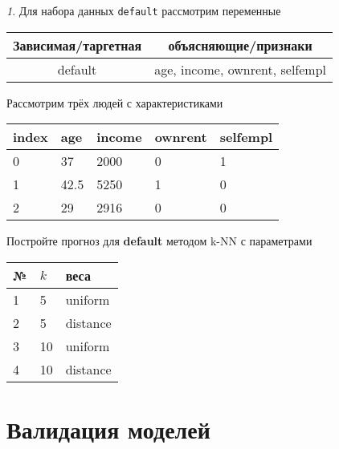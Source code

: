 \documentclass[12pt]{article}
\theoremstyle{remark}
\newtheorem{exercise}{}[section]
\begin{document}
\begin{exercise}
Для набора данных \texttt{default} рассмотрим переменные
\begin{center}
	\begin{tabular}{|c|c|} \hline
		Зависимая/таргетная & объясняющие/признаки \\ \hline
		default & age, income, ownrent, selfempl \\ \hline
	\end{tabular}
\end{center}
Рассмотрим трёх людей с характеристиками
	\begin{center}
		\begin{tabular}{|l||l|l|l|l|}\hline
			index & age & income & ownrent & selfempl  \\ \hline\hline
			0 & 37 & 2000 & 0 & 1  \\
			1 & 42.5 & 5250 & 1 & 0  \\
			2 & 29 & 2916 & 0 & 0  \\ \hline
		\end{tabular}
	\end{center}
Постройте прогноз для \textbf{default} методом k-NN с параметрами
\begin{center}
	\begin{tabular}{|l|l|l|}\hline
	№ & \(k\) & веса \\ \hline
	1 & 5 & uniform \\
	2 & 5 & distance \\
	3 & 10 & uniform \\
	4 & 10 & distance \\ \hline
	\end{tabular}
\end{center}
\end{exercise}

\section{Валидация моделей}
\end{document}
